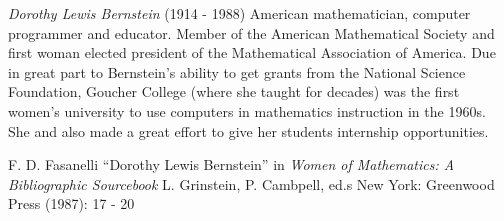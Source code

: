 \documentclass[12pt]{article}
\begin{document}
\emph{Dorothy Lewis Bernstein} (1914 - 1988) American mathematician, computer programmer and educator. Member of the American Mathematical Society and first woman elected president of the Mathematical Association of America. Due in great part to Bernstein's ability to get grants from the National Science Foundation, Goucher College (where she taught for decades) was the first women's university to use computers in mathematics instruction in the 1960s. She and also made a great effort to give her students internship opportunities.

\begin{thebibliography}{1}
 F. D. Fasanelli ``Dorothy Lewis Bernstein'' in {\it Women of Mathematics: A Bibliographic Sourcebook} L. Grinstein, P. Cambpell, ed.s New York: Greenwood Press (1987): 17 - 20
\end{thebibliography}
\end{document}
